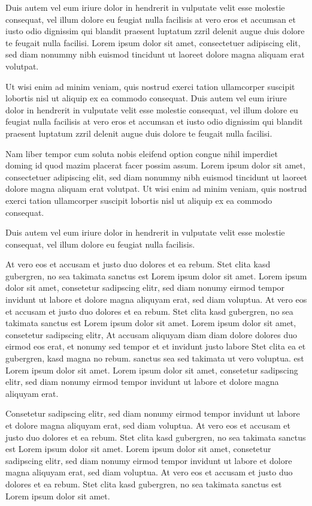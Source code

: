 \documentclass[twoside,a4paper]{article}
\begin{document}
Duis autem vel eum iriure dolor in hendrerit in vulputate velit esse molestie consequat, vel illum dolore eu feugiat nulla facilisis at vero eros et accumsan et iusto odio dignissim qui blandit praesent luptatum zzril delenit augue duis dolore te feugait nulla facilisi. Lorem ipsum dolor sit amet, consectetuer adipiscing elit, sed diam nonummy nibh euismod tincidunt ut laoreet dolore magna aliquam erat volutpat.

Ut wisi enim ad minim veniam, quis nostrud exerci tation ullamcorper suscipit lobortis nisl ut aliquip ex ea commodo consequat. Duis autem vel eum iriure dolor in hendrerit in vulputate velit esse molestie consequat, vel illum dolore eu feugiat nulla facilisis at vero eros et accumsan et iusto odio dignissim qui blandit praesent luptatum zzril delenit augue duis dolore te feugait nulla facilisi.

Nam liber tempor cum soluta nobis eleifend option congue nihil imperdiet doming id quod mazim placerat facer possim assum. Lorem ipsum dolor sit amet, consectetuer adipiscing elit, sed diam nonummy nibh euismod tincidunt ut laoreet dolore magna aliquam erat volutpat. Ut wisi enim ad minim veniam, quis nostrud exerci tation ullamcorper suscipit lobortis nisl ut aliquip ex ea commodo consequat.

Duis autem vel eum iriure dolor in hendrerit in vulputate velit esse molestie consequat, vel illum dolore eu feugiat nulla facilisis.

At vero eos et accusam et justo duo dolores et ea rebum. Stet clita kasd gubergren, no sea takimata sanctus est Lorem ipsum dolor sit amet. Lorem ipsum dolor sit amet, consetetur sadipscing elitr, sed diam nonumy eirmod tempor invidunt ut labore et dolore magna aliquyam erat, sed diam voluptua. At vero eos et accusam et justo duo dolores et ea rebum. Stet clita kasd gubergren, no sea takimata sanctus est Lorem ipsum dolor sit amet. Lorem ipsum dolor sit amet, consetetur sadipscing elitr, At accusam aliquyam diam diam dolore dolores duo eirmod eos erat, et nonumy sed tempor et et invidunt justo labore Stet clita ea et gubergren, kasd magna no rebum. sanctus sea sed takimata ut vero voluptua. est Lorem ipsum dolor sit amet. Lorem ipsum dolor sit amet, consetetur sadipscing elitr, sed diam nonumy eirmod tempor invidunt ut labore et dolore magna aliquyam erat.

Consetetur sadipscing elitr, sed diam nonumy eirmod tempor invidunt ut labore et dolore magna aliquyam erat, sed diam voluptua. At vero eos et accusam et justo duo dolores et ea rebum. Stet clita kasd gubergren, no sea takimata sanctus est Lorem ipsum dolor sit amet. Lorem ipsum dolor sit amet, consetetur sadipscing elitr, sed diam nonumy eirmod tempor invidunt ut labore et dolore magna aliquyam erat, sed diam voluptua. At vero eos et accusam et justo duo dolores et ea rebum. Stet clita kasd gubergren, no sea takimata sanctus est Lorem ipsum dolor sit amet. 
\end{document}
